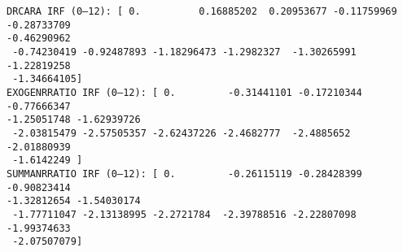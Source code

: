 \documentclass[11pt]{article}
\begin{document}
    \begin{Verbatim}[commandchars=\\\{\}]
DRCARA IRF (0–12): [ 0.          0.16885202  0.20953677 -0.11759969 -0.28733709
-0.46290962
 -0.74230419 -0.92487893 -1.18296473 -1.2982327  -1.30265991 -1.22819258
 -1.34664105]
EXOGENRRATIO IRF (0–12): [ 0.         -0.31441101 -0.17210344 -0.77666347
-1.25051748 -1.62939726
 -2.03815479 -2.57505357 -2.62437226 -2.4682777  -2.4885652  -2.01880939
 -1.6142249 ]
SUMMANRRATIO IRF (0–12): [ 0.         -0.26115119 -0.28428399 -0.90823414
-1.32812654 -1.54030174
 -1.77711047 -2.13138995 -2.2721784  -2.39788516 -2.22807098 -1.99374633
 -2.07507079]
    \end{Verbatim}

    \begin{center}
    \end{center}
    { \hspace*{\fill} \\}
    
\end{document}
